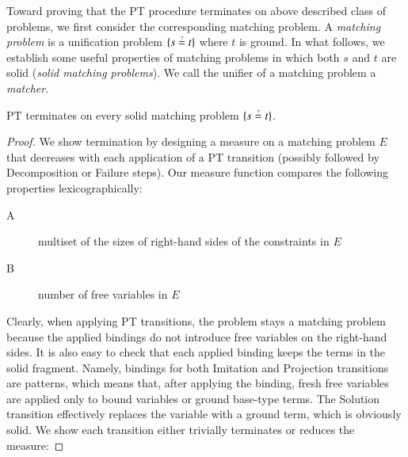 Toward proving that the PT
procedure terminates on above described class of problems, we first consider the corresponding matching problem.
A \emph{matching problem} is a unification problem
$\{ s \unif t \}$ where $t$ is ground. In what
follows, we establish some useful properties of matching problems in which both
$s$ and $t$ are solid (\emph{solid matching problems}). We call the unifier
of a matching problem a \emph{matcher}.

\begin{lemma}
    \label{unif:lemma:pt-matching-termination}
    PT terminates on every solid matching problem $\{s \unif t\}$.
\end{lemma}
\begin{proof}
    We show termination by designing a measure on a matching problem $E$ that
    decreases with each application of a PT transition (possibly followed by
    \textsf{Decomposition} or \textsf{Failure} steps). 
    Our measure function
    compares the following properties lexicographically:
    \begin{description}
        \item[A] multiset of the sizes of right-hand sides of the constraints in $E$
        \item[B] number of free variables in $E$
    \end{description}

    Clearly, when applying PT transitions, the problem stays a matching problem
    because the applied bindings do not introduce free variables on the
    right-hand sides. It is also easy to check that each applied binding keeps
    the terms in the solid fragment. Namely, bindings for both
    \textsf{Imitation} and \textsf{Projection} transitions are patterns, which means
    that, after applying the binding, fresh free variables are applied only to
    bound variables or ground base-type terms. The \textsf{Solution} transition effectively
    replaces the variable with a ground term, which is obviously solid. We show each transition 
    either trivially terminates or reduces the measure:


\end{proof}
